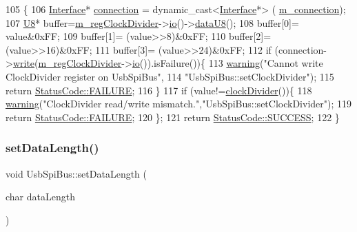 \begin{DoxyCode}
105                                               \{
106   \hyperlink{classInterface}{Interface}* \hyperlink{classElement_af57444353c1ddf9fa0109801e97debf7}{connection} = \textcolor{keyword}{dynamic\_cast<}\hyperlink{classInterface}{Interface}*\textcolor{keyword}{>} (
      \hyperlink{classElement_abe3de7a5dbbc9a6dd2d7e012e5fdb266}{m\_connection});
107   \hyperlink{ICECALv3_8h_a3cb25ca6f51f003950f9625ff05536fc}{U8}* buffer=\hyperlink{classUsbSpiBus_abfd5f040a0a8c19d972b26ea581bf1f0}{m\_regClockDivider}->\hyperlink{classIOobject_af04fb94137c3d86849f478ac5afab5d1}{io}()->\hyperlink{classIOdata_a75e9c318dbac3a39402179070943d4bc}{dataU8}();
108   buffer[0]= value&0xFF;
109   buffer[1]= (value>>8)&0xFF;
110   buffer[2]= (value>>16)&0xFF;
111   buffer[3]= (value>>24)&0xFF;
112   \textcolor{keywordflow}{if} (connection->\hyperlink{classInterface_ad665cacbaf490a26c1c4ba192022e68a}{write}(\hyperlink{classUsbSpiBus_abfd5f040a0a8c19d972b26ea581bf1f0}{m\_regClockDivider}->\hyperlink{classIOobject_af04fb94137c3d86849f478ac5afab5d1}{io}()).isFailure())\{
113     \hyperlink{classObject_a65cd4fda577711660821fd2cd5a3b4c9}{warning}(\textcolor{stringliteral}{"Cannot write ClockDivider register on UsbSpiBus"},
114         \textcolor{stringliteral}{"UsbSpiBus::setClockDivider"});
115     \textcolor{keywordflow}{return} \hyperlink{classStatusCode_a6f565cbeadc76d14c72f047e5e85eb4ba3da73d4c469762eb9d3c960368252b26}{StatusCode::FAILURE};
116   \} 
117   \textcolor{keywordflow}{if} (value!=\hyperlink{classUsbSpiBus_aa7a56b8aedb646ba46408cb5016dde1c}{clockDivider}())\{
118     \hyperlink{classObject_a65cd4fda577711660821fd2cd5a3b4c9}{warning}(\textcolor{stringliteral}{"ClockDivider read/write mismatch."},\textcolor{stringliteral}{"UsbSpiBus::setClockDivider"});
119     \textcolor{keywordflow}{return} \hyperlink{classStatusCode_a6f565cbeadc76d14c72f047e5e85eb4ba3da73d4c469762eb9d3c960368252b26}{StatusCode::FAILURE};
120   \};
121   \textcolor{keywordflow}{return} \hyperlink{classStatusCode_a6f565cbeadc76d14c72f047e5e85eb4badd0da38d3ba0d922efd1f4619bc37ad8}{StatusCode::SUCCESS};
122 \}
\end{DoxyCode}
\mbox{\label{classUsbSpiBus_abb9644f0110078dc08c84c907d11272e}} 
\subsubsection{\texorpdfstring{set\+Data\+Length()}{setDataLength()}}
{\footnotesize\ttfamily void Usb\+Spi\+Bus\+::set\+Data\+Length (\begin{DoxyParamCaption}\item[{char}]{data\+Length }\end{DoxyParamCaption})\hspace{0.3cm}{\ttfamily [inline]}}



